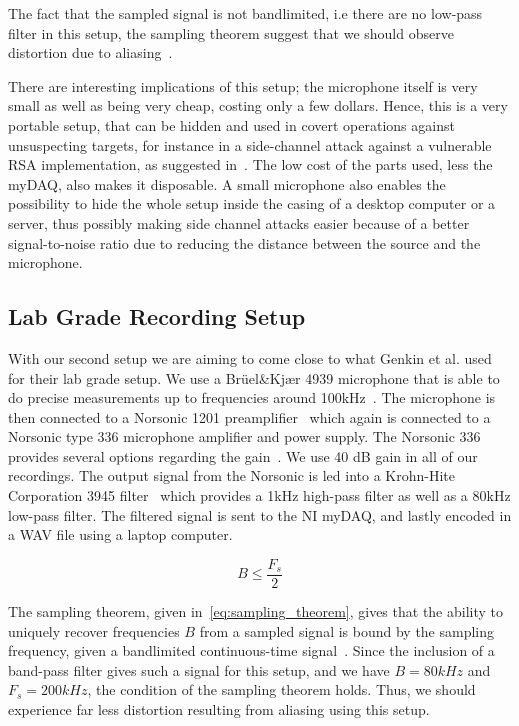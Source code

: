 The fact that the sampled signal is not bandlimited, i.e there are no low-pass filter in this setup, the sampling theorem suggest that we should observe distortion due to aliasing~\cite[pp. 384-394]{proakis2007digital}.

There are interesting implications of this setup; the microphone itself is very small as well as being very cheap, costing only a few dollars. 
Hence, this is a very portable setup, that can be hidden and used in covert operations against unsuspecting targets, for instance in a side-channel attack against a vulnerable RSA implementation, as suggested in~\cite{DBLP:conf/crypto/GenkinST14}.
The low cost of the parts used, less the myDAQ, also makes it disposable.
A small microphone also enables the possibility to hide the whole setup inside the casing of a desktop computer or a server, thus possibly making side channel attacks easier because of a better signal-to-noise ratio due to reducing the distance between the source and the microphone.


\subsection{Lab Grade Recording Setup}\label{chp3:sec:bruel_kjaer_configuration}
With our second setup we are aiming to come close to what Genkin et al. used for their lab grade setup.
We use a Brüel\&Kjær 4939 microphone that is able to do precise measurements up to frequencies around 100kHz~\cite{url:bk4939_spec}.
The microphone is then connected to a Norsonic 1201 preamplifier~\cite{url:norsonic1201_spec} which again is connected to a Norsonic type 336 microphone amplifier and power supply.
The Norsonic 336 provides several options regarding the gain~\cite{url:nor336_spec}. 
We use 40 dB gain in all of our recordings.
The output signal from the Norsonic is led into a Krohn-Hite Corporation 3945 filter~\cite{url:krohn-hite3945_spec} which provides a 1kHz high-pass filter as well as a 80kHz low-pass filter.
The filtered signal is sent to the \gls{NI} myDAQ, and lastly encoded in a WAV file using a laptop computer. 

\begin{equation}\label{eq:sampling_theorem}
B \leq \frac{F_{s}}{2}
\end{equation}

The sampling theorem, given in~\autoref{eq:sampling_theorem}, gives that the ability to uniquely recover frequencies $B$ from a sampled signal is bound by the sampling frequency, given a bandlimited continuous-time signal~\cite[pp. 384-394]{proakis2007digital}.
Since the inclusion of a band-pass filter gives such a signal for this setup, and we have $B = 80kHz$ and $F_s = 200kHz$, the condition of the sampling theorem holds.
Thus, we should experience far less distortion resulting from aliasing using this setup.


